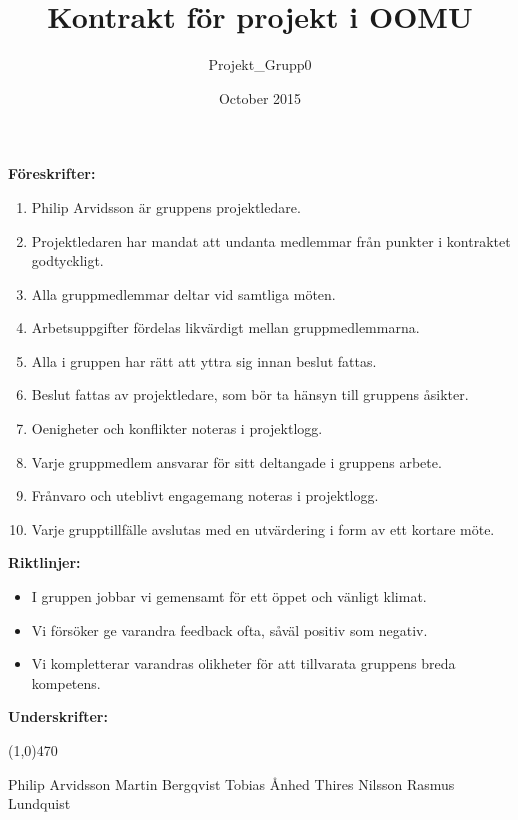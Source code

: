 \documentclass[a4paper]{article}
\title{Kontrakt för projekt i OOMU}
\author{Projekt\_Grupp0}
\date{October 2015}
\begin{document}
    \maketitle

    \vspace{1cm}
    \large \textbf{Föreskrifter:}
    \normalsize
    \begin{enumerate}
        \setlength{\itemindent}{0.5cm}
        \item Philip Arvidsson är gruppens projektledare.
        \item Projektledaren har mandat att undanta medlemmar från punkter i kontraktet godtyckligt.
        \item Alla gruppmedlemmar deltar vid samtliga möten.
        \item Arbetsuppgifter fördelas likvärdigt mellan gruppmedlemmarna.
        \item Alla i gruppen har rätt att yttra sig innan beslut fattas.
        \item Beslut fattas av projektledare, som bör ta hänsyn till gruppens åsikter.
        \item Oenigheter och konflikter noteras i projektlogg.
        \item Varje gruppmedlem ansvarar för sitt deltangade i gruppens arbete.
        \item Frånvaro och uteblivt engagemang noteras i projektlogg.
        \item Varje grupptillfälle avslutas med en utvärdering i form av ett kortare möte.
    \end{enumerate}
    \vspace{1cm}
    \large \textbf{Riktlinjer:}
    \normalsize
    \begin{itemize}
        \setlength{\itemindent}{0.5cm}
        \item I gruppen jobbar vi gemensamt för ett öppet och vänligt klimat.
        \item Vi försöker ge varandra feedback ofta, såväl positiv som negativ.
        \item Vi kompletterar varandras olikheter för att tillvarata gruppens breda kompetens.
    \end{itemize}
    \vspace{2cm}
    \large \textbf{Underskrifter:}
    \vspace{1cm}
    \begin{center}
    \line(1,0){470}
    \end{center}

    \small
    Philip Arvidsson \qquad Martin Bergqvist \qquad Tobias Ånhed \qquad Thires Nilsson \qquad Rasmus Lundquist
\end{document}
